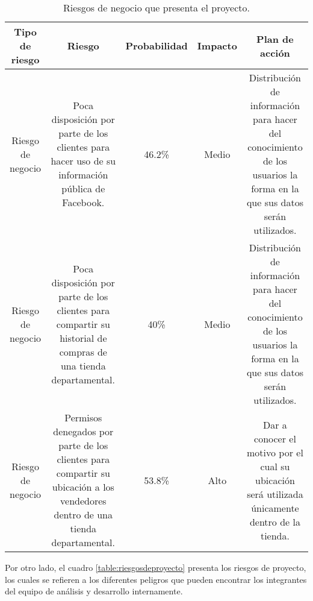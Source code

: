\FloatBarrier
\begin{table}[htb]
\setlength\extrarowheight{2pt} %
\begin{tabularx}{\textwidth}{|C|C|C|C|C|}
\hline
\textbf{Tipo de riesgo} & \textbf{Riesgo} & \textbf{Probabilidad}  & \textbf{Impacto}  & \textbf{Plan de acción}
\\ \hline
Riesgo de negocio & Poca disposición por parte de los clientes para hacer uso de su información pública de Facebook. & 46.2\% & Medio & Distribución de información para hacer del conocimiento de los usuarios la forma en la que sus datos serán utilizados.
\\ \hline
Riesgo de negocio & Poca disposición por parte de los clientes para compartir su historial de compras de una tienda departamental. & 40\% & Medio & Distribución de información para hacer del conocimiento de los usuarios la forma en la que sus datos serán utilizados.
\\ \hline
Riesgo de negocio & Permisos denegados por parte de los clientes para compartir su ubicación a los vendedores dentro de una tienda departamental. & 53.8\% & Alto & Dar a conocer el motivo por el cual su ubicación será utilizada únicamente dentro de la tienda.
\\ \hline
\end{tabularx}
\caption{Riesgos de negocio que presenta el proyecto.}
\label{table:riesgosnegocio2}
\end{table}
\FloatBarrier
Por otro lado, el cuadro \ref{table:riesgosdeproyecto} presenta los riesgos de proyecto, los cuales se refieren a los diferentes peligros que pueden encontrar los integrantes del equipo de análisis y desarrollo internamente.
\FloatBarrier

